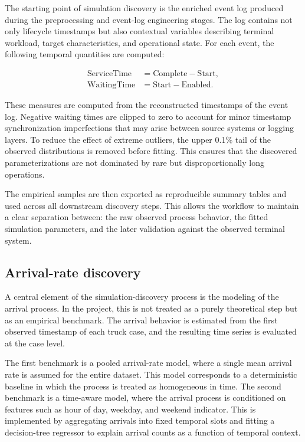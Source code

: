 The starting point of simulation discovery is the enriched event log produced during the preprocessing and event-log engineering stages.
The log contains not only lifecycle timestamps but also contextual variables describing terminal workload, target characteristics, and operational state.
For each event, the following temporal quantities are computed:

\begin{align}
\text{ServiceTime} &= \text{Complete} - \text{Start}, \\
\text{WaitingTime} &= \text{Start} - \text{Enabled}.
\end{align}

These measures are computed from the reconstructed timestamps of the event log.
Negative waiting times are clipped to zero to account for minor timestamp synchronization imperfections that may arise between source systems or logging layers.
To reduce the effect of extreme outliers, the upper 0.1\% tail of the observed distributions is removed before fitting.
This ensures that the discovered parameterizations are not dominated by rare but disproportionally long operations.

The empirical samples are then exported as reproducible summary tables and used across all downstream discovery steps.
This allows the workflow to maintain a clear separation between:
the raw observed process behavior, the fitted simulation parameters, and the later validation against the observed terminal system.

\subsection{Arrival-rate discovery}

A central element of the simulation-discovery process is the modeling of the arrival process.
In the project, this is not treated as a purely theoretical step but as an empirical benchmark.
The arrival behavior is estimated from the first observed timestamp of each truck case, and the resulting time series is evaluated at the case level.

The first benchmark is a pooled arrival-rate model, where a single mean arrival rate is assumed for the entire dataset.
This model corresponds to a deterministic baseline in which the process is treated as homogeneous in time.
The second benchmark is a time-aware model, where the arrival process is conditioned on features such as hour of day, weekday, and weekend indicator.
This is implemented by aggregating arrivals into fixed temporal slots and fitting a decision-tree regressor to explain arrival counts as a function of temporal context.

